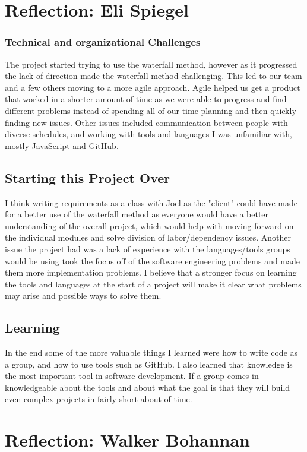 \documentclass[a4paper]{article}
\begin{document}
\section{Reflection: Eli Spiegel}
\subsubsection{Technical and organizational Challenges}
The project started trying to use the waterfall method, however as it progressed the lack of direction made the waterfall method challenging. This led to our team and a few others moving to a more agile approach. Agile helped us get a product that worked in a shorter amount of time as we were able to progress and find different problems instead of spending all of our time planning and then quickly finding new issues. Other issues included communication between people with diverse schedules, and working with tools and languages I was unfamiliar with, mostly JavaScript and GitHub.

\subsection{Starting this Project Over}
I think writing requirements as a class with Joel as the "client" could have made for a better use of the waterfall method as everyone would have a better understanding of the overall project, which would help with moving forward on the individual modules and solve division of labor/dependency issues. Another issue the project had was a lack of experience with the languages/tools groups would be using took the focus off of the software engineering problems and made them more implementation problems. I believe that a stronger focus on learning the tools and languages at the start of a project will make it clear what problems may arise and possible ways to solve them. 

\subsection{Learning}
In the end some of the more valuable things I learned were how to write code as a group, and how to use tools such as GitHub. I also learned that knowledge is the most important tool in software development.  If a group comes in knowledgeable about the tools and about what the goal is that they will build even complex projects in fairly short about of time.

\section{Reflection: Walker Bohannan}
\end{document}
